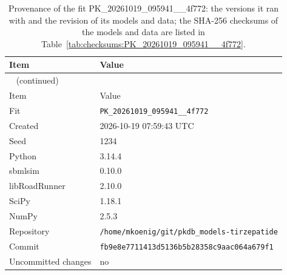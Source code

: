 \documentclass{article}
\begin{document}
\begin{longtable}{ll}
\caption{Provenance of the fit PK\_20261019\_095941\_\_4f772: the versions it ran with and the revision of its models and data; the SHA-256 checksums of the models and data are listed in Table~\ref{tab:checksums:PK_20261019_095941__4f772}.}\label{tab:provenance:PK_20261019_095941__4f772} \\
\toprule
Item & Value \\
\midrule
\endfirsthead
\multicolumn{2}{l}{\small\tablename~\thetable{} (continued)} \\
\toprule
Item & Value \\
\midrule
\endhead
\bottomrule
\endlastfoot
Fit & \texttt{PK\_20261019\_095941\_\_4f772} \\
Created & 2026-10-19 07:59:43 UTC \\
Seed & 1234 \\
Python & 3.14.4 \\
sbmlsim & 0.10.0 \\
libRoadRunner & 2.10.0 \\
SciPy & 1.18.1 \\
NumPy & 2.5.3 \\
Repository & \texttt{/home/mkoenig/git/pkdb\_models-tirzepatide} \\
Commit & \texttt{fb9e8e7711413d5136b5b28358c9aac064a679f1} \\
Uncommitted changes & no \\
\end{longtable}



\end{document}
